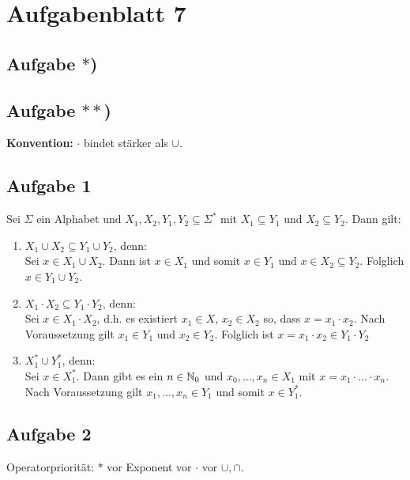 
\section{Aufgabenblatt 7}

\subsection*{Aufgabe $\ast$)}

\subsection*{Aufgabe $\ast\ast$)}
\textbf{Konvention:} $\cdot$ bindet stärker als $\cup$.

\subsection{Aufgabe 1}
Sei $\Sigma$ ein Alphabet und $X_1,X_2,Y_1,Y_2\subseteq\Sigma^\ast$ mit $X_1\subseteq Y_1$ und $X_2\subseteq Y_2$. Dann gilt:
\begin{enumerate}
	\item $X_1\cup X_2\subseteq Y_1\cup Y_2$, denn:\\
	Sei $x\in X_1\cup X_2$. 
	Dann ist $x\in X_1$ und somit $x\in Y_1$ und $x\in X_2\subseteq Y_2$. Folglich $x\in Y_1\cup Y_2$.
	\item $X_1\cdot X_2\subseteq Y_1\cdot Y_2$, denn:\\
	Sei $x\in X_1\cdot X_2$, d.h. es existiert $x_1\in X$, $x_2\in X_2$ so, dass $x=x_1\cdot x_2$. 
	Nach Voraussetzung gilt $x_1\in Y_1$ und $x_2\in Y_2$. 
	Folglich ist $x=x_1\cdot x_2\in Y_1\cdot Y_2$
	\item $X_1^\ast\cup Y_1^\ast$, denn:\\
	Sei $x\in X_1^\ast$. 
	Dann gibt es ein $n\in\mathbb{N}_0$ und $x_0,\ldots, x_n\in X_1$ mit $x=x_1\cdot\ldots\cdot x_n$. 
	Nach Voraussetzung gilt $x_1,\ldots,x_n\in Y_1$ und somit $x\in Y_1^\ast$.
\end{enumerate}

\subsection{Aufgabe 2}
Operatorpriorität: $\ast$ vor Exponent vor $\cdot$ vor $\cup,\cap$.

